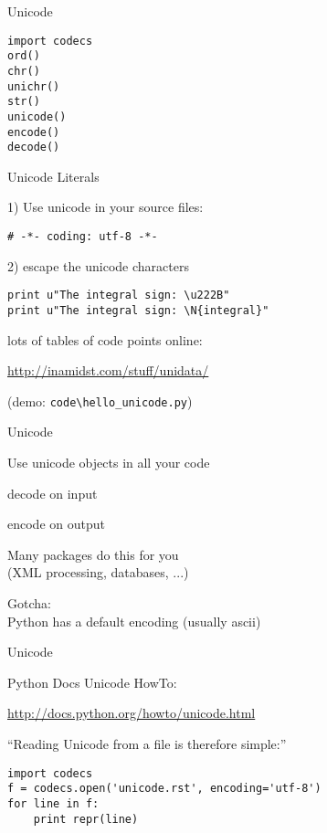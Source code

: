 \documentclass{beamer}
\begin{document}
\begin{frame}[fragile]{Unicode}

{\large
\begin{verbatim}
import codecs
ord()
chr()
unichr()
str()
unicode()
encode()
decode()
\end{verbatim}
}
\end{frame}

\begin{frame}[fragile]{Unicode Literals}


{\Large 1) Use unicode in your source files:}

\begin{verbatim}
# -*- coding: utf-8 -*-
\end{verbatim}

\vfill
{\Large 2) escape the unicode characters}

\begin{verbatim}
print u"The integral sign: \u222B"
print u"The integral sign: \N{integral}"
\end{verbatim}

{\large lots of tables of code points online:}

\url{http://inamidst.com/stuff/unidata/}

\vfill
(demo: \verb|code\hello_unicode.py|)
\end{frame}


\begin{frame}[fragile]{Unicode}

{\Large
Use unicode objects in all your code

\vfill
decode on input

\vfill
encode on output

\vfill
Many packages do this for you\\
\hspace{0.25in} (XML processing, databases, ...)

\vfill
Gotcha:\\
\hspace{0.25in} Python has a default encoding (usually ascii)
}
\end{frame}

\begin{frame}[fragile]{Unicode}

{\Large Python Docs Unicode HowTo:}

\url{http://docs.python.org/howto/unicode.html}

\vfill
{\Large ``Reading Unicode from a file is therefore simple:''}

\begin{verbatim}
import codecs
f = codecs.open('unicode.rst', encoding='utf-8')
for line in f:
    print repr(line)
\end{verbatim}

\end{frame}
\end{document}
